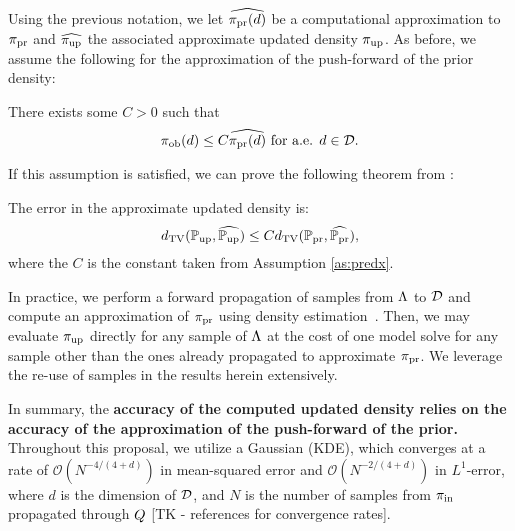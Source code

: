 

Using the previous notation, we let $\widehat{\operatorname*{\pi_{pr}}(d)}$ be a computational approximation to $\operatorname*{\pi_{pr}}$ and $\widehat{\operatorname*{\pi_{up}}}$ the associated approximate updated density $\operatorname*{\pi_{up}}$.
As before, we assume the following for the approximation of the push-forward of the prior density:
\begin{assumption}\label{as:predx}
There exists some $C>0$ such that
\[
\operatorname*{\pi_{ob}} (d) \leq C \widehat{\operatorname*{\pi_{pr}}(d)} \text{ for a.e. } d\in \mathcal{D}.
\]
\end{assumption}

If this assumption is satisfied, we can prove the following theorem from \cite{BJW18}:
\begin{thm}
The error in the approximate updated density is:
\begin{equation}\label{eq:predicted_bound}
d_{\text{TV}} (\operatorname*{\mathbb{P}_{up}}, \widehat{\operatorname*{\mathbb{P}_{up}}}) \leq C d_{\text{TV}} (\operatorname*{\mathbb{P}_{pr}}, \widehat{\operatorname*{\mathbb{P}_{pr}}}),
\end{equation}
where the $C$ is the constant taken from Assumption \ref{as:predx}. 
\end{thm}

In practice, we perform a forward propagation of samples from ${\Lambda}$ to $\mathcal{D}$ and compute an approximation of $\operatorname*{\pi_{pr}}$ using density estimation~\cite{BJW18}.
Then, we may evaluate $\operatorname*{\pi_{up}}$ directly for any sample of ${\Lambda}$ at the cost of one model solve for any sample other than the ones already propagated to approximate $\operatorname*{\pi_{pr}}$. 
We leverage the re-use of samples in the results herein extensively.

In summary, the \textbf{accuracy of the computed updated density relies on the accuracy of the approximation of the push-forward of the prior.}
Throughout this proposal, we utilize a Gaussian (KDE), which converges at a rate of $\mathcal{O}(N^{-4/(4+d)})$ in mean-squared error and $\mathcal{O}(N^{-2/(4+d)})$ in $L^1$-error, where $d$ is the dimension of $\mathcal{D}$, and $N$ is the number of samples from $\operatorname*{\pi_{in}}$ propagated through $Q$ [TK - references for convergence rates].

